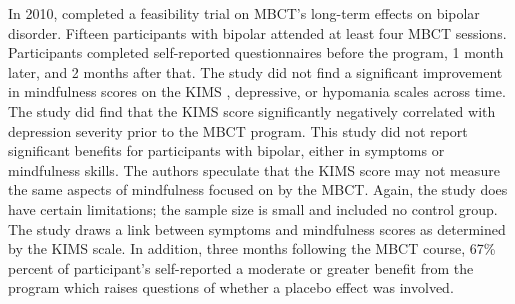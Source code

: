 In 2010, \citet{weber_mindfulness-based_2010} completed a feasibility trial on MBCT’s long-term effects on bipolar disorder. Fifteen participants with bipolar attended at least four MBCT sessions. Participants completed self-reported questionnaires before the program, 1 month later, and 2 months after that. The study did not find a significant improvement in mindfulness scores on the KIMS \cite{baer_assessment_2004}, depressive, or hypomania scales across time. The study did find that the KIMS score significantly negatively correlated with depression severity prior to the MBCT program. This study did not report significant benefits for participants with bipolar, either in symptoms or mindfulness skills. The authors speculate that the KIMS score may not measure the same aspects of mindfulness focused on by the MBCT. Again, the study does have certain limitations; the sample size is small and included no control group. The study draws a link between symptoms and mindfulness scores as determined by the KIMS scale. In addition, three months following the MBCT course, 67\% percent of participant’s self-reported a moderate or greater benefit from the program which raises questions of whether a placebo effect was involved.
  